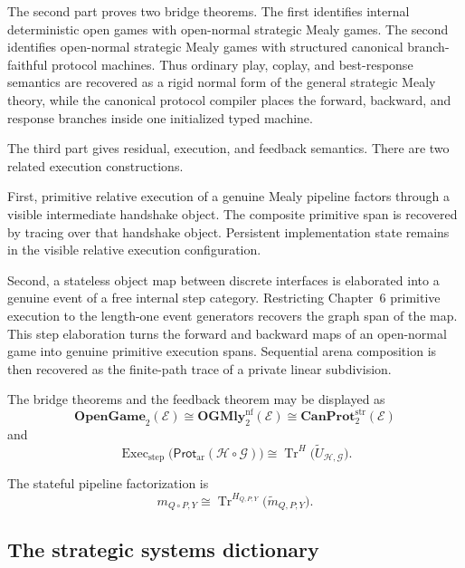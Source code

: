 The second part proves two bridge theorems. The first identifies internal deterministic open games
with open-normal strategic Mealy games. The second identifies open-normal strategic Mealy games
with structured canonical branch-faithful protocol machines. Thus ordinary play, coplay, and
best-response semantics are recovered as a rigid normal form of the general strategic Mealy theory,
while the canonical protocol compiler places the forward, backward, and response branches inside one
initialized typed machine.

The third part gives residual, execution, and feedback semantics. There are two related execution
constructions.

First, primitive relative execution of a genuine Mealy pipeline factors through a visible
intermediate handshake object. The composite primitive span is recovered by tracing over that
handshake object. Persistent implementation state remains in the visible relative execution
configuration.

Second, a stateless object map between discrete interfaces is elaborated into a genuine event of a
free internal step category. Restricting Chapter~6 primitive execution to the length-one event
generators recovers the graph span of the map. This step elaboration turns the forward and backward
maps of an open-normal game into genuine primitive execution spans. Sequential arena composition is
then recovered as the finite-path trace of a private linear subdivision.

The bridge theorems and the feedback theorem may be displayed as
\[
  \boxed{
  \mathbf{OpenGame}_2(\mathcal E)
  \cong
  \mathbf{OGMly}^{\mathrm{nf}}_2(\mathcal E)
  \cong
  \mathbf{CanProt}^{\mathrm{str}}_2(\mathcal E)
  }
\]
and
\[
  \boxed{
  \operatorname{Exec}_{\mathrm{step}}
  \bigl(
    \mathsf{Prot}_{\mathrm{ar}}
    (\mathcal H\circ\mathcal G)
  \bigr)
  \cong
  \operatorname{Tr}^{H}
  \bigl(
    \widetilde U_{\mathcal H,\mathcal G}
  \bigr).
  }
\]

The stateful pipeline factorization is
\[
  \boxed{
  m_{Q\circ P,Y}
  \cong
  \operatorname{Tr}^{H_{Q,P;Y}}
  \bigl(
    \widetilde m_{Q,P;Y}
  \bigr).
  }
\]

\subsection{The strategic systems dictionary}
\label{subsec:strategic-systems-dictionary}

